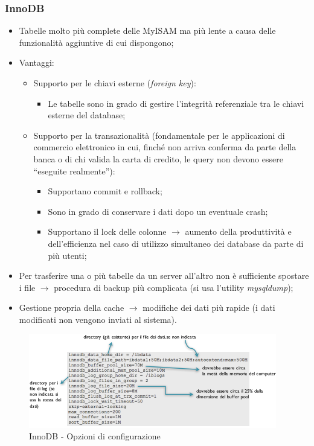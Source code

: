 \subsubsection{InnoDB}

\begin{itemize}

\item Tabelle molto più complete delle MyISAM ma più lente a causa delle funzionalità aggiuntive di cui dispongono;
\item Vantaggi:

\begin{itemize}

\item Supporto per le chiavi esterne (\textit{foreign key}):
\begin{itemize}
\item Le tabelle sono in grado di gestire l’integrità referenziale tra le chiavi esterne del database;
\end{itemize}
\item Supporto per la transazionalità (fondamentale per le applicazioni di commercio elettronico in cui, finché non arriva conferma da parte della banca o di chi valida la carta di credito, le query non devono essere “eseguite realmente”):

\begin{itemize}

\item Supportano commit e rollback;
\item Sono in grado di conservare i dati dopo un eventuale crash;
\item Supportano il lock delle colonne $\rightarrow$ aumento della produttività e dell’efficienza nel caso di utilizzo simultaneo dei database da parte di più utenti;

\end{itemize}
\end{itemize}

\item Per trasferire una o più tabelle da un server all’altro non è sufficiente spostare i file $\rightarrow$ procedura di backup più complicata (si usa l’utility \textit{mysqldump});
\item Gestione propria della cache $\rightarrow$ modifiche dei dati più rapide (i dati modificati non vengono inviati al sistema).

\end{itemize}

\begin{center}
\begin{figure}[H]
\centering
\includegraphics[scale=1]{figures/innoDB_settings.png}
\caption{InnoDB - Opzioni di configurazione} 
\end{figure}
\end{center}

